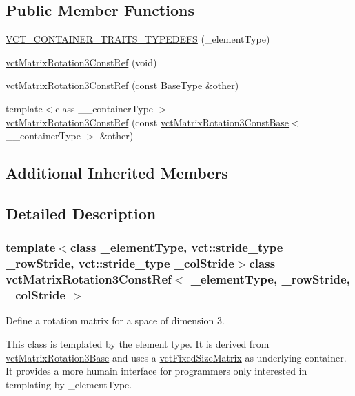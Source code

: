 \subsection*{Public Member Functions}
\begin{DoxyCompactItemize}
\item 
\hyperlink{classvct_matrix_rotation3_const_ref_af7c1f7d2b90c7d3b95a83df38fe19197}{V\+C\+T\+\_\+\+C\+O\+N\+T\+A\+I\+N\+E\+R\+\_\+\+T\+R\+A\+I\+T\+S\+\_\+\+T\+Y\+P\+E\+D\+E\+F\+S} (\+\_\+element\+Type)
\item 
\hyperlink{classvct_matrix_rotation3_const_ref_a9c17ae86f86673a157ce4c1b22582c2f}{vct\+Matrix\+Rotation3\+Const\+Ref} (void)
\item 
\hyperlink{classvct_matrix_rotation3_const_ref_acbe5e3ef35e6f173fbb6ed1b77a57850}{vct\+Matrix\+Rotation3\+Const\+Ref} (const \hyperlink{classvct_matrix_rotation3_const_ref_a72312c3cf0fe6a145043764cdd412bad}{Base\+Type} \&other)
\item 
{\footnotesize template$<$class \+\_\+\+\_\+container\+Type $>$ }\\\hyperlink{classvct_matrix_rotation3_const_ref_a0f14b8f77d86821584eb76c0fb395cab}{vct\+Matrix\+Rotation3\+Const\+Ref} (const \hyperlink{classvct_matrix_rotation3_const_base}{vct\+Matrix\+Rotation3\+Const\+Base}$<$ \+\_\+\+\_\+container\+Type $>$ \&other)
\end{DoxyCompactItemize}
\subsection*{Additional Inherited Members}


\subsection{Detailed Description}
\subsubsection*{template$<$class \+\_\+element\+Type, vct\+::stride\+\_\+type \+\_\+row\+Stride, vct\+::stride\+\_\+type \+\_\+col\+Stride$>$class vct\+Matrix\+Rotation3\+Const\+Ref$<$ \+\_\+element\+Type, \+\_\+row\+Stride, \+\_\+col\+Stride $>$}

Define a rotation matrix for a space of dimension 3. 

This class is templated by the element type. It is derived from \hyperlink{classvct_matrix_rotation3_base}{vct\+Matrix\+Rotation3\+Base} and uses a \hyperlink{classvct_fixed_size_matrix}{vct\+Fixed\+Size\+Matrix} as underlying container. It provides a more humain interface for programmers only interested in templating by \+\_\+element\+Type.


